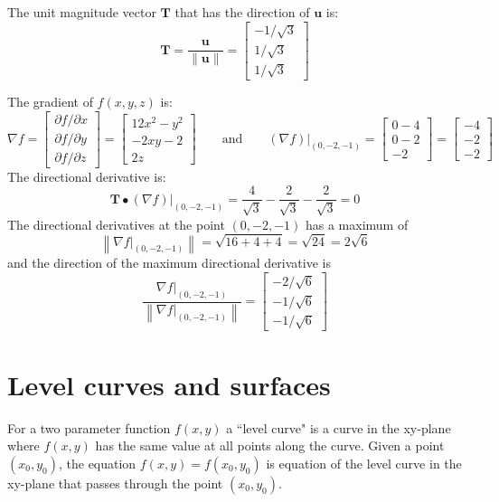 \documentclass{article}
\begin{document}
\begin{itemize}
The unit magnitude vector \(\mathbf{T}\) that has the direction of \(\mathbf{u}\) is:
\[\mathbf{T} = \frac{\mathbf{u}}{\|\mathbf{u}\|} = \begin{bmatrix} -1/\sqrt{3} \\ 1/\sqrt{3} \\ 1/\sqrt{3} \end{bmatrix}\]

The gradient of \(f(x, y, z)\) is:
\[\nabla f = \begin{bmatrix} \partial f/\partial x \\ \partial f/\partial y \\ \partial f/\partial z \end{bmatrix}
= \begin{bmatrix}
12x^2 - y^2 \\ 
-2xy - 2 \\ 
2z
\end{bmatrix} \quad\quad\text{and}\quad\quad (\nabla f)\Big|_{(0, -2, -1)} = \begin{bmatrix}
0 - 4 \\ 
0 - 2 \\ 
-2
\end{bmatrix} = \begin{bmatrix}
-4 \\ 
-2 \\ 
-2 
\end{bmatrix}\]
The directional derivative is:
\[\mathbf{T} \bullet (\nabla f)\Big|_{(0, -2, -1)} 
= \frac{4}{\sqrt{3}} - \frac{2}{\sqrt{3}} - \frac{2}{\sqrt{3}}
= 0\]
The directional derivatives at the point \((0, -2, -1)\) has a maximum of 
\[\left\|\nabla f\Big|_{(0, -2, -1)}\right\| = \sqrt{16 + 4 + 4} = \sqrt{24} = 2\sqrt{6}\]
and the direction of the maximum directional derivative is
\[\frac{\nabla f\Big|_{(0, -2, -1)}}{\left\|\nabla f\Big|_{(0, -2, -1)}\right\|} = \begin{bmatrix}
-2/\sqrt{6} \\ 
-1/\sqrt{6} \\ 
-1/\sqrt{6} 
\end{bmatrix}\]
\end{itemize}




\section*{Level curves and surfaces}

For a two parameter function \(f(x, y)\) a ``level curve" is a curve in the xy-plane where \(f(x, y)\) has the same value at all points along the curve. Given a point \((x_0, y_0)\), the equation \(f(x, y) = f(x_0, y_0)\) is equation of the level curve in the xy-plane that passes through the point \((x_0, y_0)\). 
\end{document}
